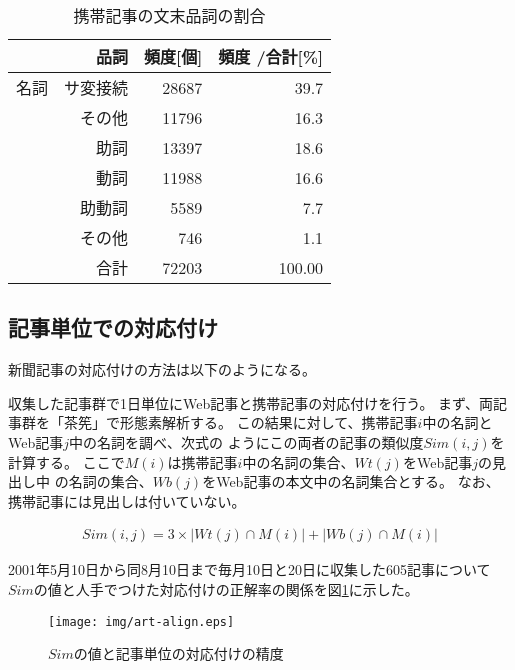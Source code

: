 \documentclass[jnlpbbl]{jnlp_j}
\begin{document}
\begin{table}[htbp]
\begin{center}
\caption{携帯記事の文末品詞の割合}
\label{bunsu}
\begin{tabular}{|r|r|r|r|} 
\hline
\multicolumn{2}{|r|}{品詞} & 頻度[個] & 頻度 \slash 合計[\%] \\
\hline \hline
名詞 & サ変接続 & 28687 & 39.7  \\
\cline{2-4} & その他 & 11796 & 16.3  \\
\hline
\multicolumn{2}{|r|}{助詞} & 13397 & 18.6  \\
\hline
\multicolumn{2}{|r|}{動詞} & 11988 & 16.6  \\
\hline
\multicolumn{2}{|r|}{助動詞} & 5589 & 7.7  \\
\hline
\multicolumn{2}{|r|}{その他} & 746 & 1.1  \\
\hline \hline
\multicolumn{2}{|r|}{合計} & 72203 & 100.00 \\
\hline
\end{tabular}
\end{center}
\end{table}


\subsection{記事単位での対応付け}\label{sub:kiji-taiou}

新聞記事の対応付けの方法は以下のようになる。

収集した記事群で1日単位にWeb記事と携帯記事の対応付けを行う。
まず、両記事群を「茶筅」\cite{chasen}で形態素解析する。
この結果に対して、携帯記事$i$中の名詞とWeb記事$j$中の名詞を調べ、次式の
ようにこの両者の記事の類似度$Sim(i,j)$を計算する。
ここで$M(i)$は携帯記事$i$中の名詞の集合、$Wt(j)$をWeb記事$j$の見出し中
の名詞の集合、$Wb(j)$をWeb記事の本文中の名詞集合とする。
なお、携帯記事には見出しは付いていない。

\begin{eqnarray}
Sim(i,j) = 3 \times |\mbox{$Wt(j) \cap M(i)$}| + |\mbox{$Wb(j) \cap M(i)$}|
\end{eqnarray}

2001年5月10日から同8月10日まで毎月10日と20日に収集した605記事について
$Sim$の値と人手でつけた対応付けの正解率の関係を図\ref{art-align}に示した。

\begin{figure}[htb]
\begin{center}
\texttt{[image: img/art-align.eps]}
\caption{$Sim$の値と記事単位の対応付けの精度}
\label{art-align}
\end{center}
\end{figure}
\end{document}

